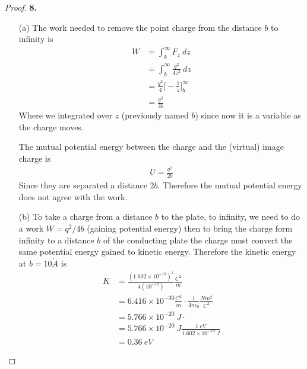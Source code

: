 \documentclass[11pt]{article}
\theoremstyle{definition}
\begin{document}
\cleardoublepage
\begin{proof}{\textbf{8.}}
\begin{itemize}
    \item [(a)] The work needed to remove the point charge from the distance $b$
    to infinity is
    \begin{align*}
        W &= \int_{b}^\infty F_z ~dz\\
        &= \int_b^\infty \frac{q^2}{4z^2}~dz\\
        &= \frac{q^2}{4}\bigg[-\frac{1}{z}\bigg]_b^\infty\\
        &= \frac{q^2}{4b}
    \end{align*}
    Where we integrated over $z$ (previously named $b$) since now it is a variable
    as the charge moves.

    The mutual potential energy between the charge and the (virtual) image
    charge is
    \begin{align*}
        U = \frac{q^2}{2b}
    \end{align*}
    Since they are separated a distance $2b$. Therefore the mutual potential
    energy does not agree with the work.
    \item [(b)] To take a charge from a distance $b$ to the plate, to
    infinity, we need to do a work $W =q^2/4b$ (gaining potential energy)
    then to bring the charge form infinity to a distance
    $b$ of the conducting plate the charge must convert the same potential
    energy gained to kinetic energy. Therefore the kinetic energy at
    $b = 10 \mathring{A}$ is 
    \begin{align*}
        K &= \frac{(1.602\times 10^{-19})^2}{4(10^{-10})} \frac{C^2}{m}\\
        &= 6.416 \times 10^{-30} \frac{C^2}{m} \cdot
        \frac{1}{4\pi\epsilon_0} \frac{Nm^2}{C^2}\\
        &= 5.766 \times 10^{-20}~J \cdot \\
        &= 5.766 \times 10^{-20}~J \frac{1~eV}{1.602 \times 10^{-19}~J}\\
        &= 0.36~eV
    \end{align*}
\end{itemize}
\end{proof}
\end{document}
